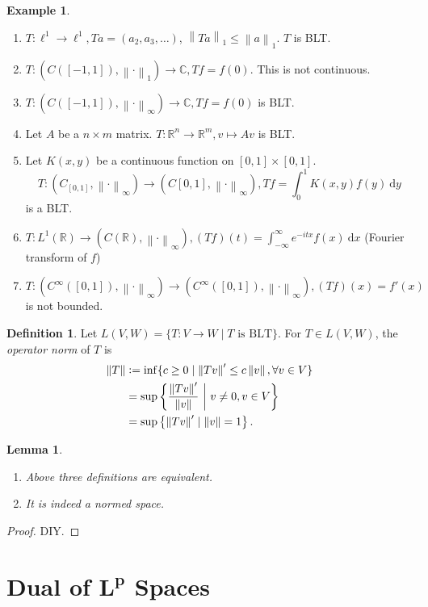 \documentclass{report}
\newcommand{\R}{\mathbb{R}}
\newcommand{\C}{\mathbb{C}}
\newcommand{\df}{\ \mathrm{d}}
\newcommand{\norm}[1]{\left\| #1 \right\|}
\newcommand{\defeq}{\vcentcolon=}
\newtheorem{lemma}[theorem]{Lemma}
\theoremstyle{definition}
\newtheorem{definition}[theorem]{Definition}
\newtheorem{example}[theorem]{Example}
\theoremstyle{remark}
\newcommand*\ttlmath[2]{\texorpdfstring{$\boldsymbol{#1}$}{#2}}
\begin{document}
\begin{example}
	\begin{enumerate}
		\item $T: \ell^1 \to \ell^1, Ta = (a_2, a_3, \ldots)$, $\norm{Ta}_1 \leq \norm{a}_1$. $T$ is BLT.
		\item $T: (C([-1, 1]), \norm{\cdot}_1) \to \C, Tf=f(0)$. This is not continuous.
		\item $T: (C([-1, 1]), \norm{\cdot}_\infty) \to \C, Tf=f(0)$ is BLT.
		\item Let $A$ be a $n \times m$ matrix. $T: \R^n \to \R^m, v \mapsto Av$ is BLT.
		\item Let $K(x, y)$ be a continuous function on $[0, 1] \times [0, 1]$. \[T: (C_[0, 1], \norm{\cdot}_\infty) \to (C[0, 1], \norm{\cdot}_\infty), Tf = \int_0^1 K(x, y)f(y) \df y\] is a BLT.
		\item $\displaystyle T: L^1(\R) \to (C(\R), \norm{\cdot}_\infty), (Tf)(t) = \int_{-\infty}^\infty e^{-itx}f(x) \df x$ (Fourier transform of $f$)
		\item $T: (C^\infty([0, 1]), \norm{\cdot}_\infty) \to (C^\infty([0, 1]), \norm{\cdot}_\infty), (Tf)(x) = f'(x)$ is not bounded.
	\end{enumerate}
\end{example}

\begin{definition}
	Let $L(V, W) = \{T: V \to W \mid T \text{ is BLT}\}$. For $T \in L(V, W)$, the \emph{operator norm} of $T$ is
	\begin{align*}
		\norm{T} & \defeq \inf\{c \geq 0 \mid \norm{Tv}' \leq c\norm{v}, \forall v \in V\} \\
		& = \sup\left\{\frac{\norm{Tv}'}{\norm{v}}\ \biggr\rvert\ v \neq 0, v \in V\right\} \\
		& = \sup\left\{\norm{Tv}' \mid \norm{v} = 1\right\}.
	\end{align*}
\end{definition}
\begin{lemma}
	\begin{enumerate}
		\item Above three definitions are equivalent.
		\item It is indeed a normed space.
	\end{enumerate}
\end{lemma}
\begin{proof}
	DIY.
\end{proof}

\section{Dual of \ttlmath{L^p}{L\textasciicircum p} Spaces}
\end{document}
